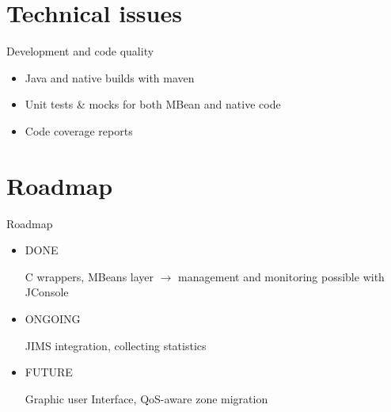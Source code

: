 \documentclass{beamer}
\begin{document}
\section{Technical issues}

	\begin{frame}{Development and code quality}

		\begin{itemize}
			\item Java and native builds with maven
			\item Unit tests \& mocks for both MBean and native code
			\item Code coverage reports
		\end{itemize}
	
	\end{frame}


\section{Roadmap}

	\begin{frame}{Roadmap}
		
		\begin{itemize}

			\item DONE
			
				C wrappers, MBeans layer $\rightarrow$ management and monitoring possible with JConsole

			\item ONGOING
			
				JIMS integration, collecting statistics

			\item FUTURE
			
				Graphic user Interface, QoS-aware zone migration

		\end{itemize}

	\end{frame}
\end{document}
